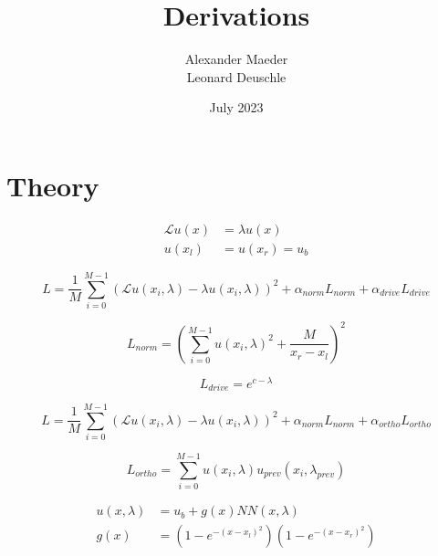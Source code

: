 \documentclass{article}
\title{Derivations}
\author{Alexander Maeder\\Leonard Deuschle}
\date{July 2023}
\begin{document}
\section{Theory}
\begin{align*}\label{eq:problemsetting}
    \mathcal{L}u\left(x\right) &= \lambda u\left(x\right)\\
    u\left(x_l\right) &= u\left(x_r\right) = u_b
\end{align*}

\begin{equation}\label{eq:loss1}
    L = \frac{1}{M} \sum \limits_{i = 0}^{M-1} \left(\mathcal{L}u\left(x_i,\lambda\right) - \lambda u\left(x_i,\lambda\right)\right)^2 + \alpha_{norm}  L_{norm} + \alpha_{drive} L_{drive}
\end{equation}

\begin{equation}\label{eq:loss_norm}
    L_{norm} = \left(\sum \limits_{i = 0}^{M-1}u\left(x_i,\lambda\right)^2  + \frac{M}{x_r - x_l}\right)^2
\end{equation}

\begin{equation}\label{eq:loss_drive}
    L_{drive} = e^{c - \lambda}
\end{equation}


\begin{equation}\label{eq:loss2}
    L = \frac{1}{M} \sum \limits_{i = 0}^{M-1} \left(\mathcal{L}u\left(x_i,\lambda\right) - \lambda u\left(x_i,\lambda\right)\right)^2 + \alpha_{norm} L_{norm} + \alpha_{ortho} L_{ortho}
\end{equation}

\begin{equation}\label{eq:loss_ortho}
    L_{ortho} = \sum \limits_{i = 0}^{M-1} u\left(x_i,\lambda\right) u_{prev}\left(x_i,\lambda_{prev}\right)
\end{equation}

\begin{align*}\label{eq:ansatz}
    u\left(x,\lambda\right) &= u_b + g\left(x\right) NN\left(x,\lambda\right)\\
    g\left(x\right) &= (1- e^{-\left(x-x_l\right)^2})(1- e^{-\left(x-x_r\right)^2})
\end{align*}
\end{document}
